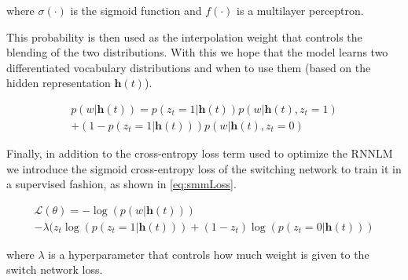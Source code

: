where $\sigma(\cdot)$ is the sigmoid function and $f(\cdot)$ is a multilayer perceptron.

This probability is then used as the interpolation weight that controls the blending of the two distributions. With this we hope that the model learns two differentiated vocabulary distributions and when to use them (based on the hidden representation $\mathbf{h}(t)$). 

\begin{equation} \label{eq:smm}
	\begin{gathered}
		p(w|\mathbf{h}(t)) = p(z_t=1|\mathbf{h}(t))p(w|\mathbf{h}(t), z_t=1) \\
		+ (1-p(z_t=1|\mathbf{h}(t)))p(w|\mathbf{h}(t), z_t=0)
	\end{gathered}
\end{equation}

Finally, in addition to the cross-entropy loss term used to optimize the RNNLM we introduce the sigmoid cross-entropy loss of the switching network to train it in a supervised fashion, as shown in \autoref{eq:smmLoss}.

\begin{equation} \label{eq:smmLoss}
	\begin{gathered}
		\mathcal{L}(\theta) = -\log(p(w|\mathbf{h}(t))) \\
		- \lambda(z_t\log(p(z_t=1|\mathbf{h}(t))) + (1 - z_t)\log(p(z_t=0|\mathbf{h}(t)))
	\end{gathered}
\end{equation}

where $\lambda$ is a hyperparameter that controls how much weight is given to the switch network loss.
